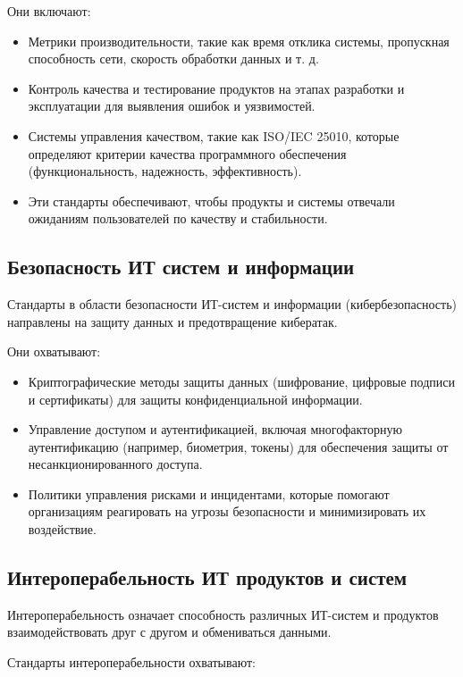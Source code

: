 Они включают:

\begin{itemize}
	\item Метрики производительности, такие как время отклика системы,
		пропускная способность сети, скорость обработки данных и т. д.
	\item Контроль качества и тестирование продуктов на этапах разработки
		и эксплуатации для выявления ошибок и уязвимостей.
	\item Системы управления качеством, такие как ISO/IEC 25010,
		которые определяют критерии качества программного обеспечения
		(функциональность, надежность, эффективность).
	\item Эти стандарты обеспечивают, чтобы продукты
		и системы отвечали ожиданиям пользователей по качеству и стабильности.
\end{itemize}

\subsection{Безопасность ИТ систем и информации}

Стандарты в области безопасности ИТ-систем и информации (кибербезопасность)
направлены на защиту данных и предотвращение кибератак.

Они охватывают:

\begin{itemize}
	\item Криптографические методы защиты данных
		(шифрование, цифровые подписи и сертификаты)
		для защиты конфиденциальной информации.
	\item Управление доступом и аутентификацией,
		включая многофакторную аутентификацию (например, биометрия, токены)
		для обеспечения защиты от несанкционированного доступа.
	\item Политики управления рисками и инцидентами,
		которые помогают организациям реагировать на угрозы безопасности
		и минимизировать их воздействие.
\end{itemize}

\subsection{Интероперабельность ИТ продуктов и систем}

Интероперабельность означает способность различных ИТ-систем
и продуктов взаимодействовать друг с другом и обмениваться данными.

Стандарты интероперабельности охватывают:

